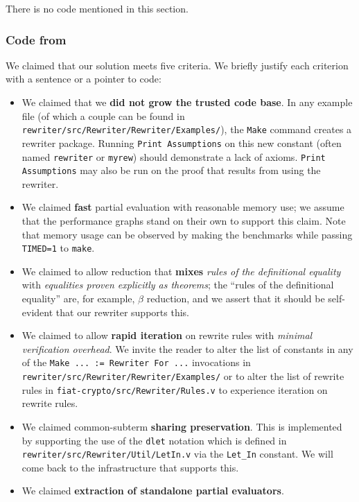 \documentclass[a4paper,USenglish,cleveref,autoref,thm-restate]{lipics-v2021}
\begin{document}
\begin{minipage}[t][1cm]{\textwidth}
There is no code mentioned in this section.

\subsubsection{Code from }

We claimed that our solution meets five criteria.
We briefly justify each criterion with a sentence or a pointer to code:
\begin{itemize}
  \item
    We claimed that we \textbf{did not grow the trusted code base}.
    In any example file (of which a couple can be found in \texttt{rewriter/src/Rewriter/Rewriter/Examples/}), the \texttt{Make} command creates a rewriter package.
    Running \texttt{Print Assumptions} on this new constant (often named \texttt{rewriter} or \texttt{myrew}) should demonstrate a lack of axioms.
    \texttt{Print Assumptions} may also be run on the proof that results from using the rewriter.
  \item
    We claimed \textbf{fast} partial evaluation with reasonable memory use; we assume that the performance graphs stand on their own to support this claim.
    Note that memory usage can be observed by making the benchmarks while passing \texttt{TIMED=1} to \texttt{make}.
  \item
    We claimed to allow reduction that \textbf{mixes} \emph{rules of the definitional equality} with \emph{equalities proven explicitly as theorems}; the ``rules of the definitional equality'' are, for example, $\beta$ reduction, and we assert that it should be self-evident that our rewriter supports this.
  \item
    We claimed to allow \textbf{rapid iteration} on rewrite rules with \emph{minimal verification overhead}.
    We invite the reader to alter the list of constants in any of the \texttt{Make ... := Rewriter For ...} invocations in \texttt{rewriter/src/Rewriter/Rewriter/Examples/} or to alter the list of rewrite rules in \texttt{fiat-crypto/src/Rewriter/Rules.v} to experience iteration on rewrite rules.
  \item
    We claimed common-subterm \textbf{sharing preservation}.
    This is implemented by supporting the use of the \texttt{dlet} notation which is defined in \texttt{rewriter/src/Rewriter/Util/LetIn.v} via the \texttt{Let\_In} constant.
    We will come back to the infrastructure that supports this.
  \item
    We claimed \textbf{extraction of standalone partial evaluators}.

\end{itemize}
\end{minipage}
\end{document}
